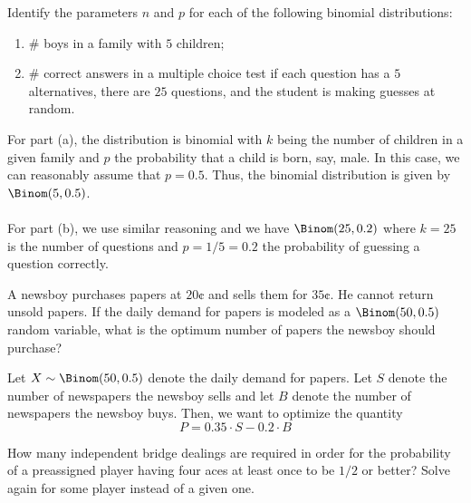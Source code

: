 \begin{problem}[Handout 8, \# 2]
  Identify the parameters \(n\) and \(p\) for each of the following
  binomial distributions:
  \begin{enumerate}[label=(\alph*),noitemsep]
  \item \(\#\) boys in a family with \(5\) children;
  \item \(\#\) correct answers in a multiple choice test if each
    question has a \(5\) alternatives, there are \(25\) questions, and the
    student is making guesses at random.
  \end{enumerate}
\end{problem}
\begin{solution}
  For part (a), the distribution is binomial with \(k\) being the number of
  children in a given family and \(p\) the probability that a child is
  born, say, male. In this case, we can reasonably assume that
  \(p=0.5\). Thus, the binomial distribution is given by
  \(\Binom(5,0.5)\).
  \\\\
  For part (b), we use similar reasoning and we have \(\Binom(25,0.2)\)
  where \(k=25\) is the number of questions and \(p=1/5=0.2\) the
  probability of guessing a question correctly.
\end{solution}
\newpage

\begin{problem}[Handout 8, \# 10]
  A newsboy purchases papers at \(20\cent\) and sells them for
  \(35\cent\). He cannot return unsold papers. If the daily demand for
  papers is modeled as a \(\Binom(50,0.5)\) random variable, what is the
  optimum number of papers the newsboy should purchase?
\end{problem}
\begin{solution}
  Let \(X\sim\Binom(50,0.5)\) denote the daily demand for papers. Let \(S\)
  denote the number of newspapers the newsboy sells and let \(B\) denote
  the number of newspapers the newsboy buys. Then, we want to optimize the
  quantity
  \[
    P=0.35\cdot S-0.2\cdot B
  \]
\end{solution}
\newpage

\begin{problem}[Handout 8, \# 12]
  How many independent bridge dealings are required in order for the
  probability of a preassigned player having four aces at least once to be
  \(1/2\) or better? Solve again for some player instead of a given one.
\end{problem}
\begin{solution}

\end{solution}
\newpage

